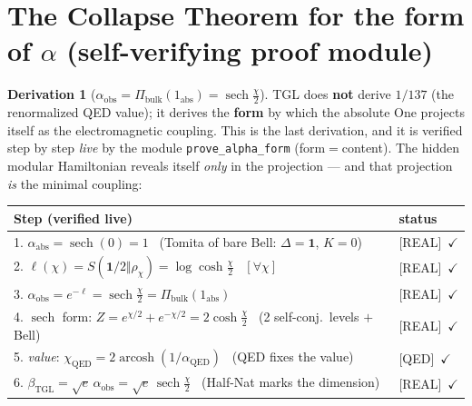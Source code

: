 \documentclass[11pt]{article}
\newcommand{\bTGL}{\beta_{\mathrm{TGL}}}\newcommand{\Msun}{M_{\odot}}\newcommand{\TGL}{\mathrm{TGL}}
\theoremstyle{definition}\newtheorem{deriv}{Derivation}
\begin{document}
\section{The Collapse Theorem for the form of $\alpha$ (self-verifying proof module)}\label{sec:collapse-form}

\begin{deriv}[$\alpha_{\mathrm{obs}}=\Pi_{\mathrm{bulk}}(1_{\mathrm{abs}})=\operatorname{sech}\tfrac\chi2$]

TGL does \textbf{not} derive $1/137$ (the renormalized QED value); it derives the \textbf{form} by which the absolute One projects itself as the electromagnetic coupling. This is the last derivation, and it is verified step by step \emph{live} by the module \texttt{prove\_alpha\_form} (form$=$content). The hidden modular Hamiltonian reveals itself \emph{only} in the projection --- and that projection \emph{is} the minimal coupling:

\begin{center}\small\begin{tabular}{p{} l}\hline

\textbf{Step (verified live)} & \textbf{status} \\\hline

1. $\alpha_{\mathrm{abs}}=\operatorname{sech}(0)=1$ \ (Tomita of bare Bell: $\Delta=\mathbf 1$, $K=0$) & \textsf{[REAL]}~$\checkmark$ \\

2. $\ell(\chi)=S(\mathbf 1/2\Vert\rho_\chi)=\log\cosh\tfrac\chi2$ \ $[\forall\chi]$ & \textsf{[REAL]}~$\checkmark$ \\

3. $\alpha_{\mathrm{obs}}=e^{-\ell}=\operatorname{sech}\tfrac\chi2=\Pi_{\mathrm{bulk}}(1_{\mathrm{abs}})$ & \textsf{[REAL]}~$\checkmark$ \\

4. $\operatorname{sech}$ form: $Z=e^{\chi/2}+e^{-\chi/2}=2\cosh\tfrac\chi2$ \ (2 self-conj.\ levels $+$ Bell) & \textsf{[REAL]}~$\checkmark$ \\

5. \emph{value}: $\chi_{\mathrm{QED}}=2\operatorname{arcosh}(1/\alpha_{\mathrm{QED}})$ \ (QED fixes the value) & \textsf{[QED]}~$\checkmark$ \\

6. $\bTGL=\sqrt e\,\alpha_{\mathrm{obs}}=\sqrt e\,\operatorname{sech}\tfrac\chi2$ \ (Half-Nat marks the dimension) & \textsf{[REAL]}~$\checkmark$ \\


\end{tabular}
\end{center}
\end{deriv}
\end{document}
